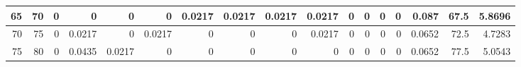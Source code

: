 \begin{table}[ht]
\begin{adjustbox}{width = \textwidth, center}
\begin{tabular}{|rr|r|r|r|r|r|r|r|r|r|r|r|r|r|r|r|}
            \cellcolor[HTML]{C8E4BE}65             & \cellcolor[HTML]{D9EAD3}70             & \cellcolor[HTML]{FFFFFF}0                      & \cellcolor[HTML]{FFFFFF}0                      & \cellcolor[HTML]{FFFFFF}0                      & \cellcolor[HTML]{FFFFFF}0                      & \cellcolor[HTML]{C7E9D8}0.0217                 & \cellcolor[HTML]{C7E9D8}0.0217                 & \cellcolor[HTML]{C7E9D8}0.0217                 & \cellcolor[HTML]{C7E9D8}0.0217                  & \cellcolor[HTML]{FFFFFF}0                       & \cellcolor[HTML]{FFFFFF}0                       & \cellcolor[HTML]{FFFFFF}0                       & \cellcolor[HTML]{FFFFFF}0                       & \cellcolor[HTML]{D9D2E9}0.087                                                   & \cellcolor[HTML]{D9D2E9}67.5                                            & \cellcolor[HTML]{D9D2E9}5.8696                                                                   \\ \hline
            \rowcolor[HTML]{FFFFFF} 
            \cellcolor[HTML]{C8E4BE}70             & \cellcolor[HTML]{D9EAD3}75             & 0                                              & \cellcolor[HTML]{C7E9D8}0.0217                 & 0                                              & \cellcolor[HTML]{C7E9D8}0.0217                 & 0                                              & 0                                              & 0                                              & \cellcolor[HTML]{C7E9D8}0.0217                  & 0                                               & 0                                               & 0                                               & 0                                               & \cellcolor[HTML]{D9D2E9}0.0652                                                  & \cellcolor[HTML]{D9D2E9}72.5                                            & \cellcolor[HTML]{D9D2E9}4.7283                                                                   \\ \hline
            \rowcolor[HTML]{FFFFFF} 
            \cellcolor[HTML]{C8E4BE}75             & \cellcolor[HTML]{D9EAD3}80             & 0                                              & \cellcolor[HTML]{8FD2B1}0.0435                 & \cellcolor[HTML]{C7E9D8}0.0217                 & 0                                              & 0                                              & 0                                              & 0                                              & 0                                               & 0                                               & 0                                               & 0                                               & 0                                               & \cellcolor[HTML]{D9D2E9}0.0652                                                  & \cellcolor[HTML]{D9D2E9}77.5                                            & \cellcolor[HTML]{D9D2E9}5.0543                                                                   \\ \hline

\end{tabular}
\end{adjustbox}
\end{table}
